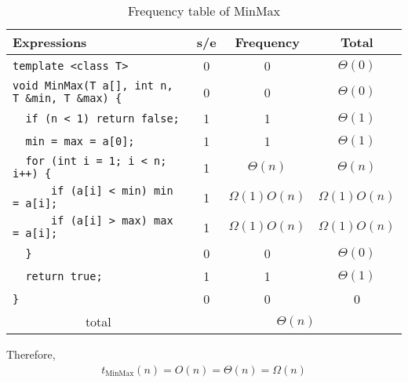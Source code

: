 \documentclass{article}
\begin{document}
\begin{table}[H]
    \centering
    \begin{tabular}{|l|c|c|c|}
        \hline
        Expressions                                        & s/e                               & Frequency       & Total           \\
        \hline
        \verb|template <class T>|                          & 0                                 & 0               & $\Theta(0)$     \\
        \verb|void MinMax(T a[], int n, T &min, T &max) {| & 0                                 & 0               & $\Theta(0)$     \\
        \verb|  if (n < 1) return false;|                  & 1                                 & 1               & $\Theta(1)$     \\
        \verb|  min = max = a[0];|                         & 1                                 & 1               & $\Theta(1)$     \\
        \verb|  for (int i = 1; i < n; i++) {|             & 1                                 & $\Theta(n)$     & $\Theta(n)$     \\
        \verb|      if (a[i] < min) min = a[i];|           & 1                                 & $\Omega(1)O(n)$ & $\Omega(1)O(n)$ \\
        \verb|      if (a[i] > max) max = a[i];|           & 1                                 & $\Omega(1)O(n)$ & $\Omega(1)O(n)$ \\
        \verb|  }|                                         & 0                                 & 0               & $\Theta(0)$     \\
        \verb|  return true;|                              & 1                                 & 1               & $\Theta(1)$     \\
        \verb|}|                                           & 0                                 & 0               & 0               \\
        \hline
        \multicolumn{1}{|c|}{total}                        & \multicolumn{3}{|c|}{$\Theta(n)$}                                     \\
        \hline
    \end{tabular}
    \caption{Frequency table of MinMax}
\end{table}
Therefore,
\begin{align}
    \boxed{t_{\text{MinMax}}(n) = O(n) = \Theta(n) = \Omega(n)}
\end{align}
\end{document}
